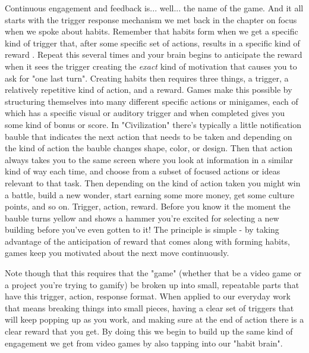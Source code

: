 \documentclass[11pt]{book}
\begin{document}
Continuous engagement and feedback is... well... the name of the game. And it all starts with the trigger response mechanism we met back in the chapter on focus when we spoke about habits. Remember  that habits form when we get a specific kind of trigger that, after some specific set of actions, results in a specific kind of reward \cite{duhigg}. Repeat this several times and your brain begins to anticipate the reward when it sees the trigger creating the \textit{exact} kind of motivation that causes you to ask for "one last turn". Creating habits then requires three things, a trigger, a relatively repetitive kind of action, and a reward. Games make this possible by structuring themselves into many different specific actions or minigames, each of which has a specific visual or auditory trigger and when completed gives you some kind of bonus or score. In "Civilization" there's typically a little notification bauble that indicates the next action that needs to be taken and depending on the kind of action the bauble changes shape, color, or design. Then that action always takes you to the same screen where you look at information in a similar kind of way each time, and choose from a subset of focused actions or ideas relevant to that task. Then depending on the kind of action taken you might win a battle, build a new wonder, start earning some more money, get some culture points, and so on. Trigger, action, reward. Before you know it the moment the bauble turns yellow and shows a hammer you're excited for selecting a new building before you've even gotten to it! The principle is simple - by taking advantage of the anticipation of reward that comes along with forming habits, games keep you motivated about the next move continuously.  
\newline

Note though that this requires that the "game" (whether that be a video game or a project you're trying to gamify) be broken up into small, repeatable parts that have this trigger, action, response format. When applied to our everyday work that means breaking things into small pieces, having a clear set of triggers that will keep popping up as you work, and making sure at the end of action there is a clear reward that you get. By doing this we begin to build up the same kind of engagement we get from video games by also tapping into our "habit brain". 
\newline
\end{document}
